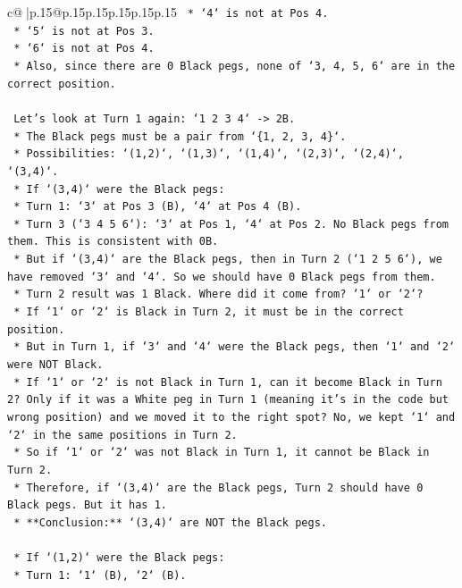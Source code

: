 \documentclass{article}
\begin{document}
{\begin{supertabular}{c@{$\;$}|p{.15\linewidth}@{}p{.15\linewidth}p{.15\linewidth}p{.15\linewidth}p{.15\linewidth}p{.15\linewidth}}
{{{\texttt{    *   `4` is not at Pos 4.} \\
\texttt{    *   `5` is not at Pos 3.} \\
\texttt{    *   `6` is not at Pos 4.} \\
\texttt{    *   Also, since there are 0 Black pegs, none of `3, 4, 5, 6` are in the correct position.} \\
\\ 
\texttt{    Let's look at Turn 1 again: `1 2 3 4` {-}> 2B.} \\
\texttt{    *   The Black pegs must be a pair from `\{1, 2, 3, 4\}`.} \\
\texttt{    *   Possibilities: `(1,2)`, `(1,3)`, `(1,4)`, `(2,3)`, `(2,4)`, `(3,4)`.} \\
\texttt{    *   If `(3,4)` were the Black pegs:} \\
\texttt{        *   Turn 1: `3` at Pos 3 (B), `4` at Pos 4 (B).} \\
\texttt{        *   Turn 3 (`3 4 5 6`): `3` at Pos 1, `4` at Pos 2. No Black pegs from them. This is consistent with 0B.} \\
\texttt{        *   But if `(3,4)` are the Black pegs, then in Turn 2 (`1 2 5 6`), we have removed `3` and `4`. So we should have 0 Black pegs from them.} \\
\texttt{        *   Turn 2 result was 1 Black. Where did it come from? `1` or `2`?} \\
\texttt{        *   If `1` or `2` is Black in Turn 2, it must be in the correct position.} \\
\texttt{        *   But in Turn 1, if `3` and `4` were the Black pegs, then `1` and `2` were NOT Black.} \\
\texttt{        *   If `1` or `2` is not Black in Turn 1, can it become Black in Turn 2? Only if it was a White peg in Turn 1 (meaning it's in the code but wrong position) and we moved it to the right spot? No, we kept `1` and `2` in the same positions in Turn 2.} \\
\texttt{        *   So if `1` or `2` was not Black in Turn 1, it cannot be Black in Turn 2.} \\
\texttt{        *   Therefore, if `(3,4)` are the Black pegs, Turn 2 should have 0 Black pegs. But it has 1.} \\
\texttt{        *   **Conclusion:** `(3,4)` are NOT the Black pegs.} \\
\\ 
\texttt{    *   If `(1,2)` were the Black pegs:} \\
\texttt{        *   Turn 1: `1` (B), `2` (B).} \\
}}}
\end{supertabular}}
\end{document}
